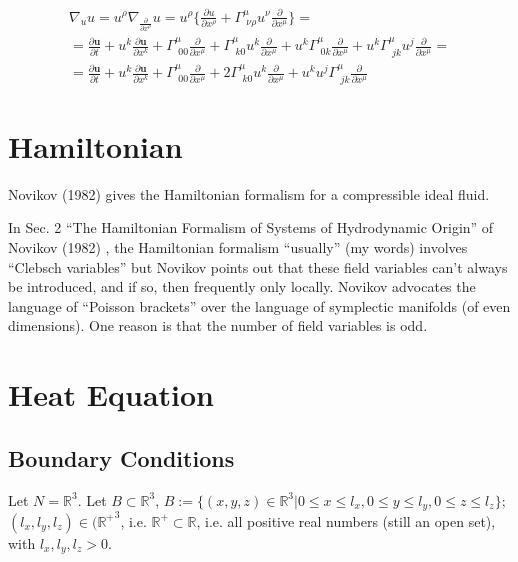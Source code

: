 \documentclass[10pt]{amsart}
\begin{document}
\begin{multicols*}{2}
\[
\begin{gathered}
  \nabla_u u = u^{\rho} \nabla_{ \frac{ \partial }{ \partial x^{\rho}} } u = u^{\rho} \lbrace \frac{ \partial u }{ \partial x^{\rho }} + \Gamma^{\mu}_{ \, \, \nu \rho } u^{\nu} \frac{ \partial }{ \partial x^{\mu } } \rbrace = \\
  = \frac{ \partial \mathbf{u}}{ \partial t} +  u^k \frac{ \partial \mathbf{u}}{ \partial x^k } + \Gamma^{\mu}_{ \,\, 0 0} \frac{ \partial }{ \partial x^{\mu} } + \Gamma^{\mu}_{ \, \, k0 } u^k \frac{ \partial }{ \partial x^{\mu }} + u^k \Gamma^{\mu}_{ \, \, 0k} \frac{ \partial }{ \partial x^{\mu} } + u^k \Gamma^{\mu}_{ \, \, jk} u^j \frac{ \partial }{ \partial x^{\mu } } = \\
  = \frac{ \partial \mathbf{u} }{ \partial t} + u^k \frac{ \partial \mathbf{u}}{ \partial x^k} + \Gamma^{\mu}_{ \, \, 0 0} \frac{ \partial }{ \partial x^{\mu} } + 2 \Gamma^{\mu}_{ \, \, k0} u^k \frac{ \partial }{ \partial x^{\mu} } + u^k u^j \Gamma^{\mu}_{ \, \, jk} \frac{ \partial }{ \partial x^{\mu } }
  \end{gathered}
\]


\section{Hamiltonian}

Novikov (1982) \cite{Novi1982} gives the Hamiltonian formalism for a compressible ideal fluid.

In Sec. 2 ``The Hamiltonian Formalism of Systems of Hydrodynamic Origin'' of Novikov (1982) \cite{Novi1982}, the Hamiltonian formalism ``usually'' (my words) involves ``Clebsch variables'' but Novikov points out that these field variables can't always be introduced, and if so, then frequently only locally.  Novikov advocates the language of ``Poisson brackets'' over the language of symplectic manifolds (of even dimensions).  One reason is that the number of field variables is odd.



\section{Heat Equation} 

\subsection{Boundary Conditions}

Let $N= \mathbb{R}^3$.  Let $B\subset \mathbb{R}^3$, $B := \lbrace (x,y,z) \in \mathbb{R}^3 | 0 \leq x \leq l_x, 0 \leq y \leq l_y, 0 \leq z \leq l_z \rbrace$; $(l_x,l_y,l_z) \in (\mathbb{R^+}^3$, i.e. $\mathbb{R}^+ \subset \mathbb{R}$, i.e. all positive real numbers (still an open set), with $l_x,l_y,l_z >0$.


\end{multicols*}
\end{document}

